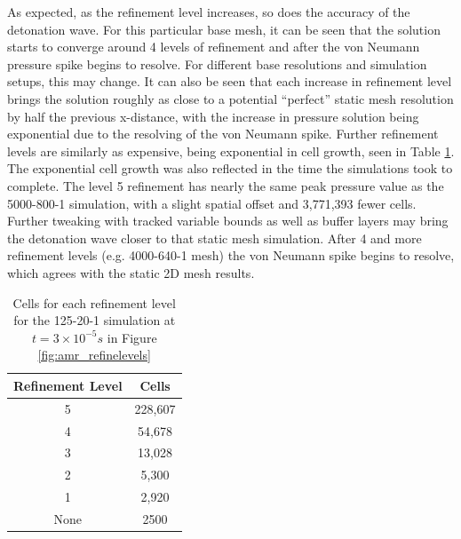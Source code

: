 \noindent As expected, as the refinement level increases, so does the accuracy of the detonation wave. For this particular base mesh, it can be seen that the solution starts to converge around 4 levels of refinement and after the von Neumann pressure spike begins to resolve. For different base resolutions and simulation setups, this may change. It can also be seen that each increase in refinement level brings the solution roughly as close to a potential ``perfect'' static mesh resolution by half the previous x-distance, with the increase in pressure solution being exponential due to the resolving of the von Neumann spike. Further refinement levels are similarly as expensive, being exponential in cell growth, seen in Table \ref{tab:amr_refinelevels}. The exponential cell growth was also reflected in the time the simulations took to complete. The level 5 refinement has nearly the same peak pressure value as the 5000-800-1 simulation, with a slight spatial offset and 3,771,393 fewer cells. Further tweaking with tracked variable bounds as well as buffer layers may bring the detonation wave closer to that static mesh simulation. After 4 and more refinement levels (e.g. 4000-640-1 mesh) the von Neumann spike begins to resolve, which agrees with the static 2D mesh results. 


\begin{table}
\centering
\caption{Cells for each refinement level for the 125-20-1 simulation at \(t = 3\times 10^{ - 5} s\) in Figure \ref{fig:amr_refinelevels}}
\label{tab:amr_refinelevels}
\begin{tabular}{cc}
Refinement Level & Cells \\ \hline
5 & 228,607 \\ 
4 & 54,678 \\ 
3 & 13,028 \\ 
2 & 5,300 \\
1 & 2,920 \\
None & 2500 \\
\end{tabular}
\end{table}

